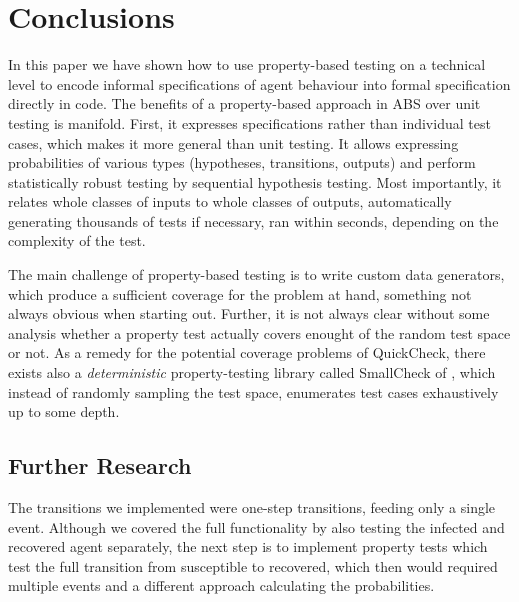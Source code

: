 \section{Conclusions}
\label{sec:conclusions}
In this paper we have shown how to use property-based testing on a technical level to encode informal specifications of agent behaviour into formal specification directly in code. The benefits of a property-based approach in ABS over unit testing is manifold. First, it expresses specifications rather than individual test cases, which makes it more general than unit testing. It allows expressing probabilities of various types (hypotheses, transitions, outputs) and perform statistically robust testing by sequential hypothesis testing. Most importantly, it relates whole classes of inputs to whole classes of outputs, automatically generating thousands of tests if necessary, ran within seconds, depending on the complexity of the test. 

The main challenge of property-based testing is to write custom data generators, which produce a sufficient coverage for the problem at hand, something not always obvious when starting out. Further, it is not always clear without some analysis whether a property test actually covers enought of the random test space or not. As a remedy for the potential coverage problems of QuickCheck, there exists also a \textit{deterministic} property-testing library called SmallCheck of \cite{runciman_smallcheck_2008}, which instead of randomly sampling the test space, enumerates test cases exhaustively up to some depth.


\subsection{Further Research}
The transitions we implemented were one-step transitions, feeding only a single event. Although we covered the full functionality by also testing the infected and recovered agent separately, the next step is to implement property tests which test the full transition from susceptible to recovered, which then would required multiple events and a different approach calculating the probabilities.